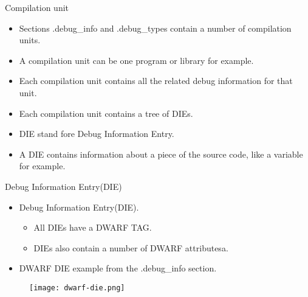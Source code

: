 
\begin{frame}{Compilation unit}
	\begin{itemize}
		\item Sections .debug\_info and .debug\_types contain a number of compilation units.
		\item A compilation unit can be one program or library for example.
		\item Each compilation unit contains all the related debug information for that unit.
		\item Each compilation unit contains a tree of DIEs.
		\item DIE stand fore Debug Information Entry.
		\item A DIE contains information about a piece of the source code, like a variable for example.
	\end{itemize}
\end{frame}




\begin{frame}{Debug Information Entry(DIE)}
	\begin{itemize}
	    \item Debug Information Entry(DIE).
		\begin{itemize}
	    		\item All DIEs have a DWARF TAG.
	    		\item DIEs also contain a number of DWARF attributesa.
		\end{itemize}
	    \item DWARF DIE example from the .debug\_info section.
	\end{itemize}
	\begin{figure}
		\texttt{[image: dwarf-die.png]}
	\end{figure}
\end{frame}

